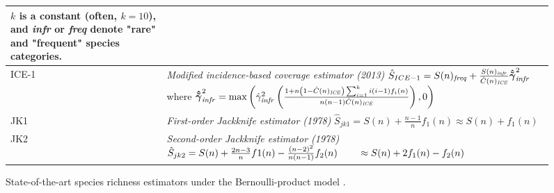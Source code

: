 \documentclass[conference]{IEEEtran}
\begin{document}
\begin{figure}
\begin{tabular}{@{}p{1.2cm}@{ }|@{ }p{}}
      $k$ is a constant (often, $k=10$), and\newline
      \emph{infr} or \emph{freq} denote "rare" and "frequent" species categories.\\
      \hline
      ICE-1 \cite{gotelli2013} & \emph{Modified incidence-based coverage estimator (2013)}\newline
      $\hat S_{ICE-1} = S(n)_{\text{\emph{freq}}} + \frac{S(n)_{\text{\emph{infr}}}}{\hat C(n)_{\text{\emph{ICE}}}} \bm{\hat{\tilde \gamma}}^2_{\text{\emph{infr}}}$ \newline
      where\newline
      $\bm{\hat{\tilde \gamma}}^2_{\text{\emph{infr}}} = \max \left(\hat \gamma^2_{\text{\emph{infr}}} \left(\frac{1+n\left(1 - \hat C(n)_{\text{\emph{ICE}}}\right)\sum_{i=1}^{k}i(i-1)f_i(n)}{n\left(n-1\right) \hat C(n)_{\text{\emph{ICE}}}} \right), 0 \right)$\\
      \hline
      JK1 \cite{burnham1978}& \emph{First-order Jackknife estimator (1978)}\newline
      $\hat S_{jk1}  = S(n) + \frac{n-1}{n}f_1(n) \approx S(n) + f_1(n)$ \\
      \hline
      JK2 \cite{burnham1978}& \emph{Second-order Jackknife estimator (1978)}\newline
      $\hat S_{jk2} = S(n) + \frac{2n-3}{n}f1(n) - \frac{(n-2)^2}{n(n-1)}f_2(n) \newline \textcolor{white}{.}\quad\ \ \,
          \approx S(n) + 2f_1(n) - f_2(n)$\\
      \hline
  \end{tabular}
  \caption{State-of-the-art species richness estimators under the Bernoulli-product model \cite{spade,incidenceSurvey}.}
  \label{tab:estimators}
\end{figure}
\end{document}
